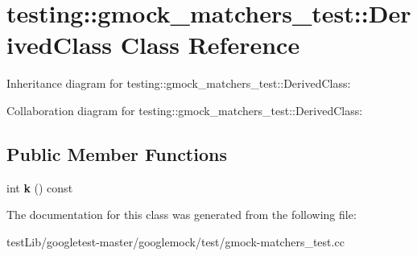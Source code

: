 \hypertarget{classtesting_1_1gmock__matchers__test_1_1DerivedClass}{}\section{testing\+:\+:gmock\+\_\+matchers\+\_\+test\+:\+:Derived\+Class Class Reference}
\label{classtesting_1_1gmock__matchers__test_1_1DerivedClass}


Inheritance diagram for testing\+:\+:gmock\+\_\+matchers\+\_\+test\+:\+:Derived\+Class\+:


Collaboration diagram for testing\+:\+:gmock\+\_\+matchers\+\_\+test\+:\+:Derived\+Class\+:
\subsection*{Public Member Functions}
\begin{DoxyCompactItemize}
\item 
\mbox{\label{classtesting_1_1gmock__matchers__test_1_1DerivedClass_a6f8638915c84cb14365e337d99857847}} 
int {\bfseries k} () const
\end{DoxyCompactItemize}


The documentation for this class was generated from the following file\+:\begin{DoxyCompactItemize}
\item 
test\+Lib/googletest-\/master/googlemock/test/gmock-\/matchers\+\_\+test.\+cc\end{DoxyCompactItemize}
